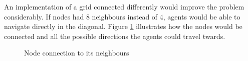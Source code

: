 An implementation of a grid connected differently would improve the problem considerably. If nodes had $8$ neighbours instead of $4$, agents would be able to navigate directly in the diagonal. Figure \ref{fig:connection} illustrates how the nodes would be connected and all the possible directions the agents could travel twards.

\begin{figure}[H]
\myfloatalign
{} \quad
{}

\caption{Node connection to its neighbours}
\label{fig:connection}
\end{figure}
